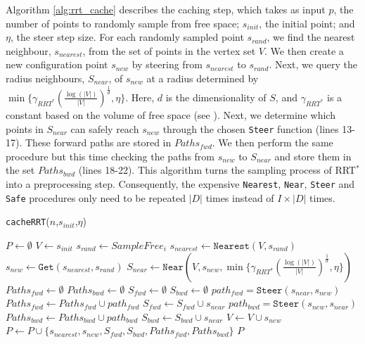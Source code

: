 \documentclass[a4paper,11pt]{report}
\begin{document}
Algorithm \ref{alg:rrt_cache} describes the caching step, which takes as input $p$, the number of points to randomly sample from free space; $s_{init}$, the initial point; and $\eta$, the steer step size. For each randomly sampled point $s_{rand}$, we find the nearest neighbour, $s_{nearest}$, from the set of points in the vertex set $V$. We then create a new configuration point $s_{new}$ by steering from $s_{nearest}$ to $s_{rand}$. Next, we query the radius neighbours, $S_{near}$, of $s_{new}$ at a radius determined by  $\min\{\gamma_{RRT^*}(\frac{\log(|V|)}{|V|})^{\frac{1}{d}},\eta\}$. Here, $d$ is the dimensionality of $S$, and $\gamma_{RRT^*}$ is a constant based on the volume of free space (see \cite{karaman2011sampling}).  Next, we determine which points in $S_{near}$ can safely reach $s_{new}$ through the chosen \texttt{Steer} function (lines 13-17). These forward paths are stored in $Paths_{fwd}$. We then perform the same procedure but this time checking the paths from $s_{new}$ to $S_{near}$ and store them in the set $Paths_{bwd}$ (lines 18-22). This algorithm turns the sampling process of RRT$^*$  into a preprocessing step. Consequently, the expensive \texttt{Nearest}, \texttt{Near}, \texttt{Steer} and \texttt{Safe} procedures only need to be repeated $|D|$ times instead of $I\times|D|$ times.


	\begin{algorithm}
 	\scriptsize
	\caption{\small \texttt{cacheRRT}($n$,$s_{init}$,$\eta$)}
	\label{alg:rrt_cache}
	\begin{algorithmic}[1]
	\STATE $P \gets \emptyset$ \hfill {}
	\STATE $V \gets {s_{init}}$
	\STATE $s_{rand} \gets SampleFree_i$
	\STATE $s_{nearest} \gets \texttt{Nearest}(V,s_{rand})$
	\STATE $s_{new} \gets \texttt{Get}(s_{nearest},s_{rand})$
	\STATE $S_{near} \gets \texttt{Near}(V,{s_{new}},\min\{\gamma_{RRT^*}(\frac{\log(|V|)}{|V|})^{\frac{1}{d}},\eta\})$
	\STATE $Paths_{fwd} \gets \emptyset$
	\STATE $Paths_{bwd} \gets \emptyset$
	\STATE $S_{fwd} \gets \emptyset$
	\STATE $S_{bwd} \gets \emptyset$
	\STATE $path_{fwd} = \texttt{Steer}(s_{near},s_{new})$
	\STATE $Paths_{fwd} \gets Paths_{fwd} \cup path_{fwd}$
	\STATE $S_{fwd} \gets S_{fwd} \cup s_{near}$
	\ENDIF
	\STATE $path_{bwd} = \texttt{Steer}(s_{new},s_{near})$
	\STATE $Paths_{bwd} \gets Paths_{bwd} \cup path_{bwd}$
	\STATE $S_{bwd} \gets S_{bwd} \cup s_{near}$
	\ENDIF
	\ENDFOR
	\STATE $V\gets V \cup s_{new}$
	\STATE $P \gets P \cup \{s_{nearest},s_{new},S_{fwd},S_{bwd},Paths_{fwd},Paths_{bwd}\}$
	\ENDFOR
	\RETURN $P$
	\end{algorithmic}

	\end{algorithm}
\end{document}
